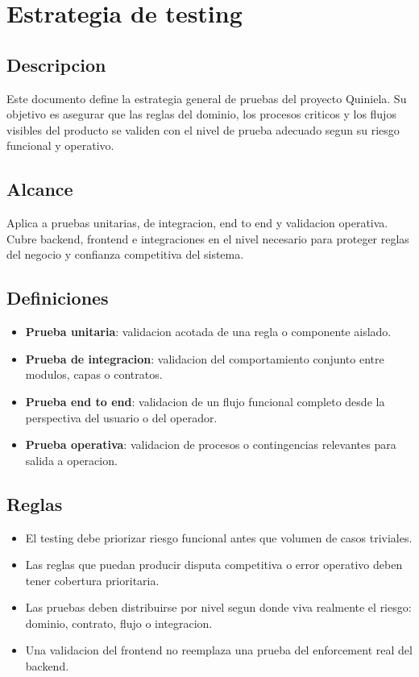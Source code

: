 \section{Estrategia de testing}

\subsection{Descripcion}

Este documento define la estrategia general de pruebas del proyecto Quiniela. Su objetivo es asegurar que las reglas del dominio, los procesos criticos y los flujos visibles del producto se validen con el nivel de prueba adecuado segun su riesgo funcional y operativo.

\subsection{Alcance}

Aplica a pruebas unitarias, de integracion, end to end y validacion operativa. Cubre backend, frontend e integraciones en el nivel necesario para proteger reglas del negocio y confianza competitiva del sistema.

\subsection{Definiciones}

\begin{itemize}
  \item \textbf{Prueba unitaria}: validacion acotada de una regla o componente aislado.
  \item \textbf{Prueba de integracion}: validacion del comportamiento conjunto entre modulos, capas o contratos.
  \item \textbf{Prueba end to end}: validacion de un flujo funcional completo desde la perspectiva del usuario o del operador.
  \item \textbf{Prueba operativa}: validacion de procesos o contingencias relevantes para salida a operacion.
\end{itemize}

\subsection{Reglas}

\begin{itemize}
  \item El testing debe priorizar riesgo funcional antes que volumen de casos triviales.
  \item Las reglas que puedan producir disputa competitiva o error operativo deben tener cobertura prioritaria.
  \item Las pruebas deben distribuirse por nivel segun donde viva realmente el riesgo: dominio, contrato, flujo o integracion.
  \item Una validacion del frontend no reemplaza una prueba del enforcement real del backend.
\end{itemize}


